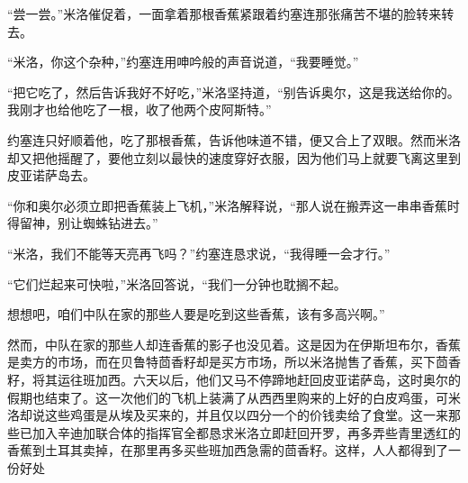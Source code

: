     “尝一尝。”米洛催促着，一面拿着那根香蕉紧跟着约塞连那张痛苦不堪的脸转来转去。

    “米洛，你这个杂种，”约塞连用呻吟般的声音说道，“我要睡觉。”

    “把它吃了，然后告诉我好不好吃，”米洛坚持道，“别告诉奥尔，这是我送给你的。我刚才也给他吃了一根，收了他两个皮阿斯特。”

    约塞连只好顺着他，吃了那根香蕉，告诉他味道不错，便又合上了双眼。然而米洛却又把他摇醒了，要他立刻以最快的速度穿好衣服，因为他们马上就要飞离这里到皮亚诺萨岛去。

    “你和奥尔必须立即把香蕉装上飞机，”米洛解释说，“那人说在搬弄这一串串香蕉时得留神，别让蜘蛛钻进去。”

    “米洛，我们不能等天亮再飞吗？”约塞连恳求说，“我得睡一会才行。”

    “它们烂起来可快啦，”米洛回答说，“我们一分钟也耽搁不起。

    想想吧，咱们中队在家的那些人要是吃到这些香蕉，该有多高兴啊。”

    然而，中队在家的那些人却连香蕉的影子也没见着。这是因为在伊斯坦布尔，香蕉是卖方的市场，而在贝鲁特茴香籽却是买方市场，所以米洛抛售了香蕉，买下茴香籽，将其运往班加西。六天以后，他们又马不停蹄地赶回皮亚诺萨岛，这时奥尔的假期也结束了。这一次他们的飞机上装满了从西西里购来的上好的白皮鸡蛋，可米洛却说这些鸡蛋是从埃及买来的，并且仅以四分一个的价钱卖给了食堂。这一来那些已加入辛迪加联合体的指挥官全都恳求米洛立即赶回开罗，再多弄些青里透红的香蕉到土耳其卖掉，在那里再多买些班加西急需的茴香籽。这样，人人都得到了一份好处
